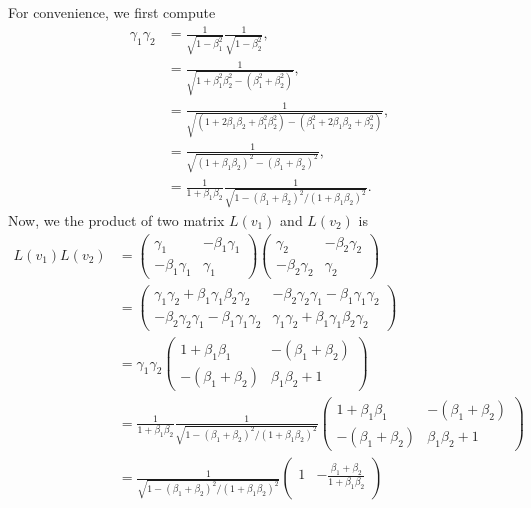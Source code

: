 \documentclass[12pt]{article}%
\begin{document}
\begin{enumerate}
{\begin{minipage}[c]{0.98\linewidth}
For convenience, we first compute
\begin{align}
\gamma_1\gamma_2 
&= \frac{1}{\sqrt{1-\beta_1^2}}\frac{1}{\sqrt{1-\beta_2^2}},\\
&= \frac{1}{\sqrt{1+\beta_1^2\beta_2^2-(\beta_1^2+\beta_2^2)}},\\
&= \frac{1}{\sqrt{(1+2\beta_1\beta_2+\beta_1^2\beta_2^2)-(\beta_1^2+2\beta_1\beta_2+\beta_2^2)}},\\
&= \frac{1}{\sqrt{(1+\beta_1\beta_2)^2 -(\beta_1+\beta_2)^2}},\\
&= \frac{1}{1+\beta_1\beta_2}\frac{1}{\sqrt{1 -(\beta_1+\beta_2)^2/(1+\beta_1\beta_2)^2}}.
\end{align}
Now, we the product of two matrix $L(v_1)$ and $L(v_2)$ is
\begin{align}
L(v_1)L(v_2) 
&= \begin{pmatrix}
	\gamma_1			&	-\beta_1\gamma_1\\
	-\beta_1\gamma_1	&	\gamma_1
	\end{pmatrix}
	\begin{pmatrix}
	\gamma_2			&	-\beta_2\gamma_2\\
	-\beta_2\gamma_2	&	\gamma_2
	\end{pmatrix}\\
&= \begin{pmatrix}
	\gamma_1\gamma_2 + \beta_1\gamma_1\beta_2\gamma_2 
	&
	-\beta_2\gamma_2\gamma_1 -\beta_1\gamma_1\gamma_2
	\\
	-\beta_2\gamma_2\gamma_1 -\beta_1\gamma_1\gamma_2
	&
	\gamma_1\gamma_2 + \beta_1\gamma_1\beta_2\gamma_2
	\end{pmatrix}\\
&= \gamma_1\gamma_2 \begin{pmatrix}
	1 + \beta_1\beta_1
	&
	-(\beta_1 + \beta_2)
	\\
	-(\beta_1 + \beta_2)
	&
	\beta_1\beta_2 + 1
	\end{pmatrix}\\
&= \frac{1}{1+\beta_1\beta_2}\frac{1}{\sqrt{1 -(\beta_1+\beta_2)^2/(1+\beta_1\beta_2)^2}}
\begin{pmatrix}
	1 + \beta_1\beta_1
	&
	-(\beta_1 + \beta_2)
	\\
	-(\beta_1 + \beta_2)
	&
	\beta_1\beta_2 + 1
	\end{pmatrix}\\
&= \frac{1}{\sqrt{1 -(\beta_1+\beta_2)^2/(1+\beta_1\beta_2)^2}}
\begin{pmatrix}
	1&\displaystyle -\frac{\beta_1 + \beta_2}{1+\beta_1\beta_2}
	\\

\end{pmatrix}
\end{align}
\end{minipage}}
\end{enumerate}
\end{document}
